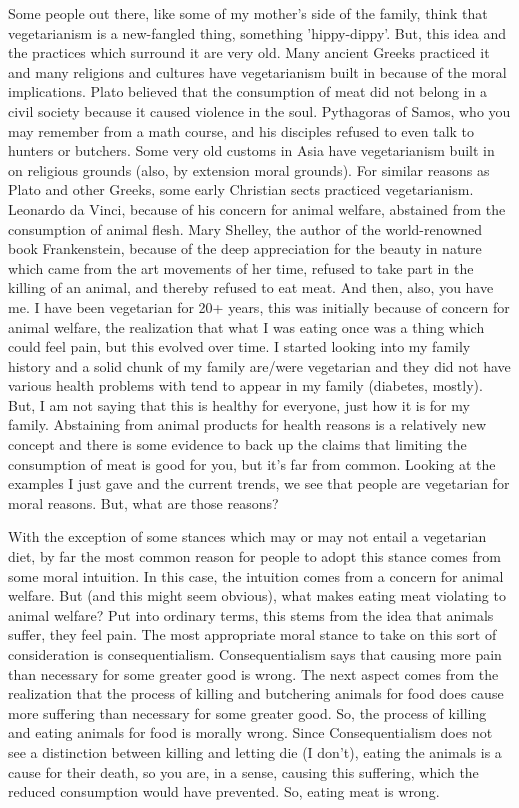 Some people out there, like some of my mother's side of the family, think that vegetarianism is a new-fangled thing, something 'hippy-dippy'. But, this idea and the practices which surround it are very old. Many ancient Greeks practiced it and many religions and cultures have vegetarianism built in because of the moral implications. Plato believed that the consumption of meat did not belong in a civil society because it caused violence in the soul. Pythagoras of Samos, who you may remember from a math course, and his disciples refused to even talk to hunters or butchers. Some very old customs in Asia have vegetarianism built in on religious grounds (also, by extension moral grounds). For similar reasons as Plato and other Greeks, some early Christian sects practiced vegetarianism. Leonardo da Vinci, because of his concern for animal welfare, abstained from the consumption of animal flesh. Mary Shelley, the author of the world-renowned book Frankenstein, because of the deep appreciation for the beauty in nature which came from the art movements of her time, refused to take part in the killing of an animal, and thereby refused to eat meat. And then, also, you have me. I have been vegetarian for 20+ years, this was initially because of concern for animal welfare, the realization that what I was eating once was a thing which could feel pain, but this evolved over time. I started looking into my family history and a solid chunk of my family are/were vegetarian and they did not have various health problems with tend to appear in my family (diabetes, mostly). But, I am not saying that this is healthy for everyone, just how it is for my family. Abstaining from animal products for health reasons is a relatively new concept and there is some evidence to back up the claims that limiting the consumption of meat is good for you, but it's far from common. Looking at the examples I just gave and the current trends, we see that people are vegetarian for moral reasons. But, what are those reasons?

With the exception of some stances which may or may not entail a vegetarian diet, by far the most common reason for people to adopt this stance comes from some moral intuition. In this case, the intuition comes from a concern for animal welfare. But (and this might seem obvious), what makes eating meat violating to animal welfare? Put into ordinary terms, this stems from the idea that animals suffer, they feel pain. The most appropriate moral stance to take on this sort of consideration is consequentialism. Consequentialism says that causing more pain than necessary for some greater good is wrong. The next aspect comes from the realization that the process of killing and butchering animals for food does cause more suffering than necessary for some greater good. So, the process of killing and eating animals for food is morally wrong. Since Consequentialism does not see a distinction between killing and letting die (I don't), eating the animals is a cause for their death, so you are, in a sense, causing this suffering, which the reduced consumption would have prevented. So, eating meat is wrong.  

